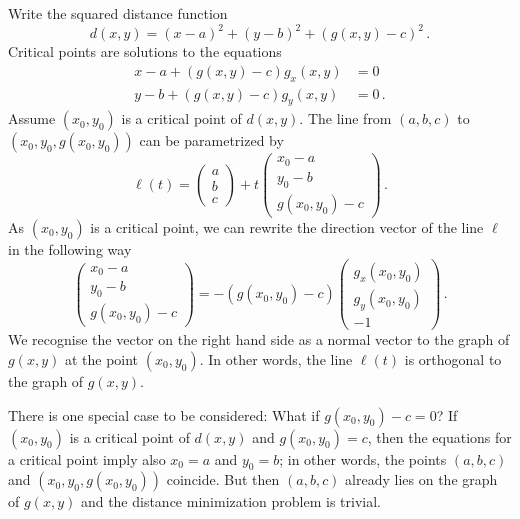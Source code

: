 \begin{solution}
Write the squared distance function
\[
d(x,y) = (x-a)^2 + (y-b)^2 + \left(g(x,y) - c\right)^2\,.
\]
Critical points are solutions to the equations
\begin{align*}
x-a + \left(g(x,y) - c\right) g_x(x,y) &= 0 \\
y-b + \left(g(x,y) - c\right) g_y(x,y) &= 0\,.
\end{align*}
Assume $(x_0,y_0)$ is a critical point of $d(x,y)$. The line from $(a,b,c)$ to $(x_0,y_0,g(x_0,y_0))$ can be parametrized by
\[
\ell(t) = \begin{pmatrix}
a \\ b \\ c \end{pmatrix}
+ t \begin{pmatrix}
x_0 - a \\ y_0 - b \\ g(x_0, y_0) - c \end{pmatrix}\,.
\]
As $(x_0, y_0)$ is a critical point, we can rewrite the direction vector of the line $\ell$ in the following way
\[
\begin{pmatrix} x_0 - a \\ y_0 - b \\ g(x_0, y_0) - c \end{pmatrix}
= -\left(g(x_0,y_0) - c\right) 
\begin{pmatrix} g_x(x_0,y_0) \\ g_y(x_0,y_0) \\ -1 \end{pmatrix}\,.
\]
We recognise the vector on the right hand side as a normal vector to the graph of $g(x,y)$ at the point $(x_0,y_0)$. In other words, the line $\ell(t)$ is orthogonal to the graph of $g(x,y)$.

There is one special case to be considered: What if $g(x_0,y_0) - c = 0$? If $(x_0,y_0)$ is a critical point of $d(x,y)$ and $g(x_0,y_0) = c$, then the equations for a critical point imply also $x_0 = a$ and $y_0 = b$; in other words, the points $(a,b,c)$ and $(x_0,y_0,g(x_0,y_0))$ coincide. But then $(a,b,c)$ already lies on the graph of $g(x,y)$ and the distance minimization problem is trivial.
\end{solution}



